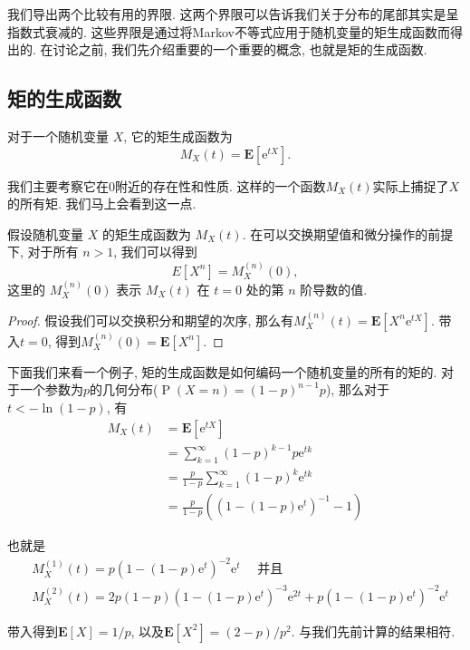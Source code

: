 我们导出两个比较有用的界限. 这两个界限可以告诉我们关于分布的尾部其实是呈指数式衰减的. 这些界限是通过将Markov不等式应用于随机变量的矩生成函数而得出的. 在讨论之前, 我们先介绍重要的一个重要的概念, 也就是矩的生成函数. 

\subsection{矩的生成函数}

\begin{definition}
    对于一个随机变量 $X$, 它的矩生成函数为$$M_X(t)=\mathbf{E}\left[\mathrm{e}^{t X}\right].$$
\end{definition}

我们主要考察它在0附近的存在性和性质. 这样的一个函数$M_X(t)$实际上捕捉了$X$的所有矩. 我们马上会看到这一点.

\begin{theorem}
    假设随机变量 $X$ 的矩生成函数为 $M_X(t)$. 
在可以交换期望值和微分操作的前提下, 对于所有 $n > 1$, 我们可以得到
$$E[X^n] = M_X^{(n)}(0),$$这里的 $M_X^{(n)}(0)$ 表示 $M_X(t)$ 在 $t = 0$ 处的第 $n$ 阶导数的值. 

\end{theorem}
\begin{proof}
    假设我们可以交换积分和期望的次序, 那么有$M_X^{(n)}(t)=\mathbf{E}\left[X^n \mathrm{e}^{t X}\right]$. 带入$t=0$, 得到$M_X^{(n)}(0)=\mathbf{E}\left[X^n\right]$. 
\end{proof}

\begin{example}
    下面我们来看一个例子, 矩的生成函数是如何编码一个随机变量的所有的矩的. 对于一个参数为$p$的几何分布($\operatorname{P}(X=n)=(1-p)^{n-1} p$), 那么对于$t<-\ln(1-p)$, 有
    $$\begin{aligned} M_X(t) & =\mathbf{E}\left[\mathrm{e}^{t X}\right] \\ & =\sum_{k=1}^{\infty}(1-p)^{k-1} p \mathrm{e}^{t k} \\ & =\frac{p}{1-p} \sum_{k=1}^{\infty}(1-p)^k \mathrm{e}^{t k} \\ & =\frac{p}{1-p}\left(\left(1-(1-p) \mathrm{e}^t\right)^{-1}-1\right)\end{aligned}$$

    也就是
    $$\begin{aligned} & M_X^{(1)}(t)=p\left(1-(1-p) \mathrm{e}^t\right)^{-2} \mathrm{e}^t \quad \text { 并且 } \\ & M_X^{(2)}(t)=2 p(1-p)\left(1-(1-p) \mathrm{e}^t\right)^{-3} \mathrm{e}^{2 t}+p\left(1-(1-p) \mathrm{e}^t\right)^{-2} \mathrm{e}^t\end{aligned}$$

    带入得到$\mathbf{E}[X]=1 / p$, 以及$\mathbf{E}\left[X^2\right]=(2-p) / p^2$. 与我们先前计算的结果相符.
\end{example}


